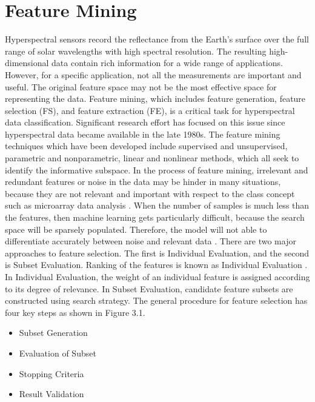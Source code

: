 \documentclass[document.tex]{subfiles}
\begin{document}
\section{Feature Mining}
Hyperspectral sensors record the reflectance from the Earth's surface over the full range of solar wavelengths with high spectral resolution. The resulting high-dimensional data contain rich information for a wide range of applications. However, for a specific application, not all the measurements are important and useful. The original feature space may not be the most effective space for representing the data. Feature mining\cite{33}, which includes feature generation, feature selection (FS), and feature extraction (FE)\cite{5}, is a critical task for hyperspectral data classification. Significant research effort has focused on this issue since hyperspectral data became available in the late 1980s. The feature mining techniques which have been developed include supervised and unsupervised, parametric and nonparametric, linear and nonlinear methods, which all seek to identify the informative subspace. In the process of feature mining, irrelevant and redundant features or noise in the data
may be hinder in many situations, because they are not relevant and important with respect to the class concept such as microarray data analysis . When the number of samples
is much less than the features, then machine learning gets particularly difficult, because
the search space will be sparsely populated. Therefore, the model will not able to differentiate accurately between noise and relevant data . There are two major approaches to
feature selection. The first is Individual Evaluation, and the second is Subset Evaluation.
Ranking of the features is known as Individual Evaluation . In Individual Evaluation,
the weight of an individual feature is assigned according to its degree of relevance. In
Subset Evaluation, candidate feature subsets are constructed using search strategy. The
general procedure for feature selection has four key steps as shown in Figure 3.1.
\begin{itemize}
	\item Subset Generation
	\item Evaluation of Subset
	\item Stopping Criteria
	\item Result Validation
\end{itemize}
\end{document}
